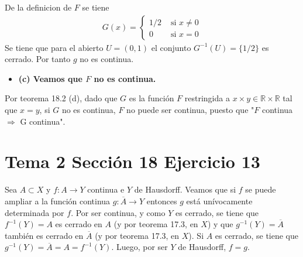 \documentclass{article}
\begin{document}
De la definicion de $F$ se tiene
\begin{eqnarray}
G(x)=\left\{
\begin{array}{ll}
1/2 &\text{ si }  x\neq 0 \\
0 & \text{ si }  x= 0
\end{array}
\right.
\end{eqnarray}
Se tiene que para el abierto $U=(0,1)$ el conjunto $G^{-1}(U)=\{1/2\}$ es cerrado. Por tanto $g$ no es continua.

\begin{itemize}
\item \bf(c) \rm Veamos que $F$ no es continua.
\end{itemize}
Por teorema 18.2 (d), dado que $G$ es la función $F$ restringida a $x\times y\in \mathbb{R}\times \mathbb{R}$ tal que $x=y$, si $G$ no es continua, $F$ no puede ser continua, puesto que "$F$ continua $\Rightarrow$ G continua".
\section{Tema 2 Sección 18 Ejercicio 13}
Sea $A\subset X$ y $f:A\rightarrow Y$ continua e $Y$ de Hausdorff. Veamos que si $f$ se puede ampliar a la función continua $g:\overline{A}\rightarrow Y$ entonces $g$ está unívocamente determinada por $f$. Por ser continua, y como $Y$ es cerrado, se tiene que $f^{-1}(Y)= A$ es cerrado en $A$ (y por teorema 17.3, en $X$) y que $g^{-1}(Y)=\overline{A}$ también es cerrado en $\overline{A}$ (y por teorema 17.3, en $X$). Si $A$ es cerrado, se tiene que $g^{-1}(Y)=\overline{A}=A=f^{-1}(Y)$. Luego, por ser $Y$ de Hausdorff,  $f=g$.
\end{document}
